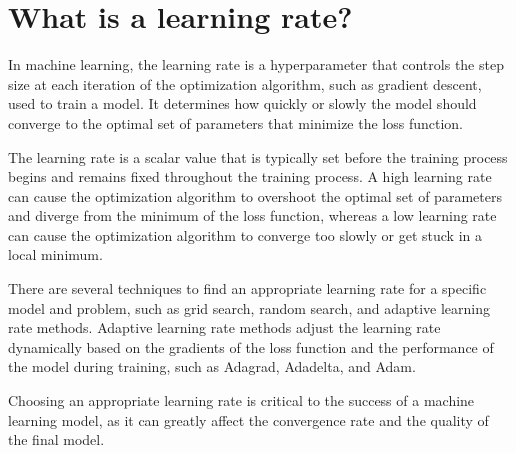 \section{What is a learning rate?}
In machine learning, the learning rate is a hyperparameter that controls the step size at each iteration of the optimization algorithm, such as gradient descent, used to train a model. It determines how quickly or slowly the model should converge to the optimal set of parameters that minimize the loss function.

The learning rate is a scalar value that is typically set before the training process begins and remains fixed throughout the training process. A high learning rate can cause the optimization algorithm to overshoot the optimal set of parameters and diverge from the minimum of the loss function, whereas a low learning rate can cause the optimization algorithm to converge too slowly or get stuck in a local minimum.

There are several techniques to find an appropriate learning rate for a specific model and problem, such as grid search, random search, and adaptive learning rate methods. Adaptive learning rate methods adjust the learning rate dynamically based on the gradients of the loss function and the performance of the model during training, such as Adagrad, Adadelta, and Adam.

Choosing an appropriate learning rate is critical to the success of a machine learning model, as it can greatly affect the convergence rate and the quality of the final model.

